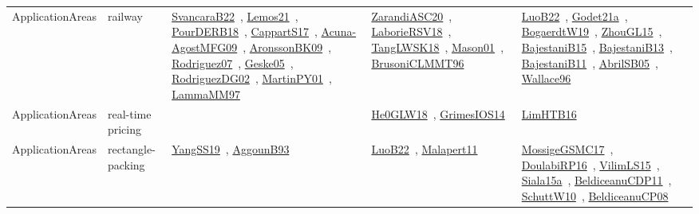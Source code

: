 {\begin{longtable}{lp{3cm}>{\raggedright\arraybackslash}p{6cm}>{\raggedright\arraybackslash}p{6cm}>{\raggedright\arraybackslash}p{8cm}}
ApplicationAreas & railway & \href{works/SvancaraB22.pdf}{SvancaraB22}~\cite{SvancaraB22}, \href{works/Lemos21.pdf}{Lemos21}~\cite{Lemos21}, \href{works/PourDERB18.pdf}{PourDERB18}~\cite{PourDERB18}, \href{works/CappartS17.pdf}{CappartS17}~\cite{CappartS17}, \href{works/Acuna-AgostMFG09.pdf}{Acuna-AgostMFG09}~\cite{Acuna-AgostMFG09}, \href{works/AronssonBK09.pdf}{AronssonBK09}~\cite{AronssonBK09}, \href{works/Rodriguez07.pdf}{Rodriguez07}~\cite{Rodriguez07}, \href{works/Geske05.pdf}{Geske05}~\cite{Geske05}, \href{works/RodriguezDG02.pdf}{RodriguezDG02}~\cite{RodriguezDG02}, \href{works/MartinPY01.pdf}{MartinPY01}~\cite{MartinPY01}, \href{works/LammaMM97.pdf}{LammaMM97}~\cite{LammaMM97} & \href{works/ZarandiASC20.pdf}{ZarandiASC20}~\cite{ZarandiASC20}, \href{works/LaborieRSV18.pdf}{LaborieRSV18}~\cite{LaborieRSV18}, \href{works/TangLWSK18.pdf}{TangLWSK18}~\cite{TangLWSK18}, \href{works/Mason01.pdf}{Mason01}~\cite{Mason01}, \href{works/BrusoniCLMMT96.pdf}{BrusoniCLMMT96}~\cite{BrusoniCLMMT96} & \href{works/LuoB22.pdf}{LuoB22}~\cite{LuoB22}, \href{works/Godet21a.pdf}{Godet21a}~\cite{Godet21a}, \href{works/BogaerdtW19.pdf}{BogaerdtW19}~\cite{BogaerdtW19}, \href{works/ZhouGL15.pdf}{ZhouGL15}~\cite{ZhouGL15}, \href{works/BajestaniB15.pdf}{BajestaniB15}~\cite{BajestaniB15}, \href{works/BajestaniB13.pdf}{BajestaniB13}~\cite{BajestaniB13}, \href{works/BajestaniB11.pdf}{BajestaniB11}~\cite{BajestaniB11}, \href{works/AbrilSB05.pdf}{AbrilSB05}~\cite{AbrilSB05}, \href{works/Wallace96.pdf}{Wallace96}~\cite{Wallace96}\\
ApplicationAreas & real-time pricing &  & \href{works/He0GLW18.pdf}{He0GLW18}~\cite{He0GLW18}, \href{works/GrimesIOS14.pdf}{GrimesIOS14}~\cite{GrimesIOS14} & \href{works/LimHTB16.pdf}{LimHTB16}~\cite{LimHTB16}\\
ApplicationAreas & rectangle-packing & \href{works/YangSS19.pdf}{YangSS19}~\cite{YangSS19}, \href{works/AggounB93.pdf}{AggounB93}~\cite{AggounB93} & \href{works/LuoB22.pdf}{LuoB22}~\cite{LuoB22}, \href{works/Malapert11.pdf}{Malapert11}~\cite{Malapert11} & \href{works/MossigeGSMC17.pdf}{MossigeGSMC17}~\cite{MossigeGSMC17}, \href{works/DoulabiRP16.pdf}{DoulabiRP16}~\cite{DoulabiRP16}, \href{works/VilimLS15.pdf}{VilimLS15}~\cite{VilimLS15}, \href{works/Siala15a.pdf}{Siala15a}~\cite{Siala15a}, \href{works/BeldiceanuCDP11.pdf}{BeldiceanuCDP11}~\cite{BeldiceanuCDP11}, \href{works/SchuttW10.pdf}{SchuttW10}~\cite{SchuttW10}, \href{works/BeldiceanuCP08.pdf}{BeldiceanuCP08}~\cite{BeldiceanuCP08}\\

\end{longtable}}
